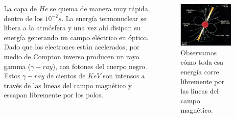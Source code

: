 \documentclass{beamer}
\begin{document}
\begin{frame}
	\begin{columns}
	
		\begin{column}{5cm}
		La capa de $He$ se quema de manera muy r\'apida, dentro de los $10^{-2}s$. La energ\'ia termonuclear
		se libera a la atm\'osfera y una vez ah\'i disipan su energ\'ia generando un campo el\'ectrico en \'optico.\\
		Dado que los electrones est\'an acelerados, por medio de Compton inverso producen un rayo gamma ($\gamma -ray$), con fotones
		del cuerpo negro.\\
		Estos $\gamma -ray$ de cientos de $KeV$ son intensos a trav\'es de las lineas del
		campo magn\'etico y escapan libremente por los polos.
		\end{column}	

		\begin{column}{5cm} 
			\begin{figure}
				\centering
				\includegraphics[scale=0.25]{expulsiondeljet.jpg}
				\caption{Observamos c\'omo toda esa energ\'ia corre libremente
				por las lineas del campo magn\'etico.}
			\end{figure}
		\end{column}	
	\end{columns}
\end{frame}


\end{document}
